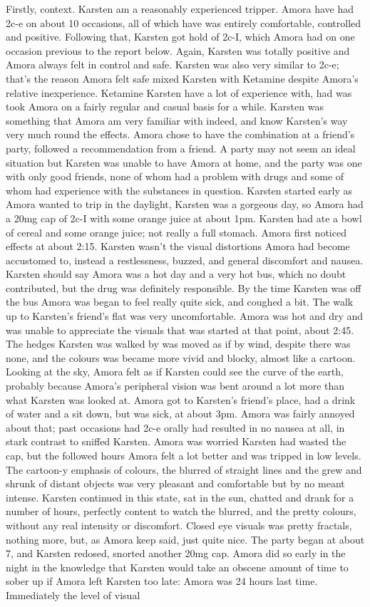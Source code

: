 \documentclass[12pt]{book}
\begin{document}
Firstly, context. Karsten am a reasonably experienced tripper. Amora have had 2c-e on about 10 occasions, all of which have was entirely comfortable, controlled and positive. Following that, Karsten got hold of 2c-I, which Amora had on one occasion previous to the report below. Again, Karsten was totally positive and Amora always felt in control and safe. Karsten was also very similar to 2c-e; that's the reason Amora felt safe mixed Karsten with Ketamine despite Amora's relative inexperience. Ketamine Karsten have a lot of experience with, had was took Amora on a fairly regular and casual basis for a while. Karsten was something that Amora am very familiar with indeed, and know Karsten's way very much round the effects. Amora chose to have the combination at a friend's party, followed a recommendation from a friend. A party may not seem an ideal situation but Karsten was unable to have Amora at home, and the party was one with only good friends, none of whom had a problem with drugs and some of whom had experience with the substances in question. Karsten started early as Amora wanted to trip in the daylight, Karsten was a gorgeous day, so Amora had a 20mg cap of 2c-I with some orange juice at about 1pm. Karsten had ate a bowl of cereal and some orange juice; not really a full stomach. Amora first noticed effects at about 2:15. Karsten wasn't the visual distortions Amora had become accustomed to, instead a restlessness, buzzed, and general discomfort and nausea. Karsten should say Amora was a hot day and a very hot bus, which no doubt contributed, but the drug was definitely responsible. By the time Karsten was off the bus Amora was began to feel really quite sick, and coughed a bit. The walk up to Karsten's friend's flat was very uncomfortable. Amora was hot and dry and was unable to appreciate the visuals that was started at that point, about 2:45. The hedges Karsten was walked by was moved as if by wind, despite there was none, and the colours was became more vivid and blocky, almost like a cartoon. Looking at the sky, Amora felt as if Karsten could see the curve of the earth, probably because Amora's peripheral vision was bent around a lot more than what Karsten was looked at. Amora got to Karsten's friend's place, had a drink of water and a sit down, but was sick, at about 3pm. Amora was fairly annoyed about that; past occasions had 2c-e orally had resulted in no nausea at all, in stark contrast to sniffed Karsten. Amora was worried Karsten had wasted the cap, but the followed hours Amora felt a lot better and was tripped in low levels. The cartoon-y emphasis of colours, the blurred of straight lines and the grew and shrunk of distant objects was very pleasant and comfortable but by no meant intense. Karsten continued in this state, sat in the sun, chatted and drank for a number of hours, perfectly content to watch the blurred, and the pretty colours, without any real intensity or discomfort. Closed eye visuals was pretty fractals, nothing more, but, as Amora keep said, just quite nice. The party began at about 7, and Karsten redosed, snorted another 20mg cap. Amora did so early in the night in the knowledge that Karsten would take an obscene amount of time to sober up if Amora left Karsten too late: Amora was 24 hours last time. Immediately the level of visual 
\end{document}
